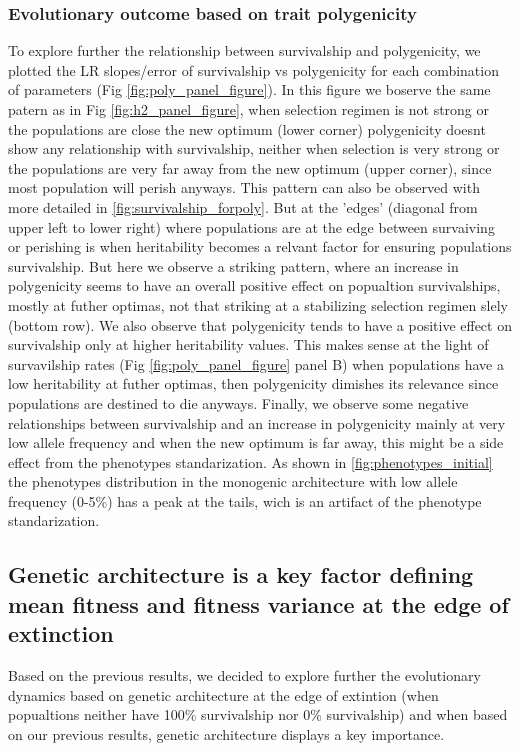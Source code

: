 \documentclass{article}
\begin{document}
\subsubsection{Evolutionary outcome based on trait polygenicity}
To explore further the relationship between survivalship and polygenicity, we plotted the LR slopes/error of survivalship vs polygenicity for each combination of parameters (Fig \ref{fig:poly_panel_figure}).  In this figure we boserve the same patern as in Fig \ref{fig:h2_panel_figure}, when selection regimen is not  strong or the populations are close the new optimum (lower corner) polygenicity doesnt show any relationship with survivalship, neither when selection is very strong or the populations are very far away from the new optimum (upper corner), since most population will perish anyways. This pattern can also be observed with more detailed in \ref{fig:survivalship_forpoly}. But at the 'edges' (diagonal from upper left to lower right) where populations are at the edge between survaiving or perishing is when heritability becomes a relvant factor for ensuring populations survivalship. But here we observe a striking pattern, where an increase in polygenicity seems to have an overall positive effect on popualtion survivalships, mostly at futher optimas, not that striking at a stabilizing selection regimen slely (bottom row). We also observe that polygenicity tends to have a positive effect on survivalship only at higher heritability values. This makes sense at the light of survavilship rates (Fig \ref{fig:poly_panel_figure} panel B) when populations have a low heritability at futher optimas, then polygenicity dimishes its relevance since populations are destined to die anyways. Finally, we observe some negative relationships between survivalship and an increase in polygenicity mainly at very low allele frequency and when the new optimum is far away, this might be a side effect from the phenotypes standarization. As shown in \ref{fig:phenotypes_initial} the phenotypes distribution in the monogenic architecture with low allele frequency (0-5\%) has a peak at the tails, wich is an artifact of the phenotype standarization. 

\subsection{Genetic architecture is a key factor defining mean fitness and fitness variance at the edge of extinction}
Based on the previous results, we decided to explore further the evolutionary dynamics based on genetic architecture at the edge of extintion (when popualtions neither have 100\% survivalship nor 0\% survivalship) and when based on our previous results, genetic architecture displays a key importance. 
\end{document}
